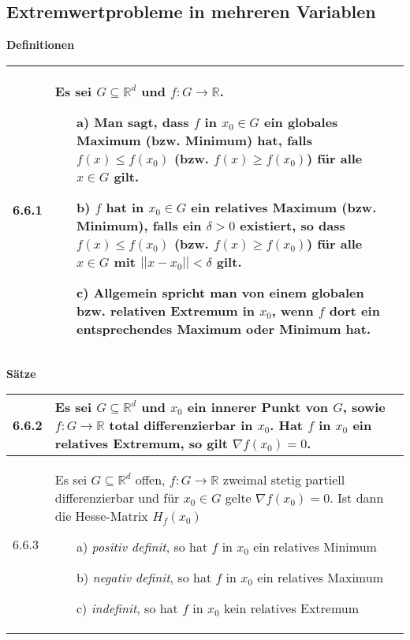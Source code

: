 \subsection{Extremwertprobleme in mehreren Variablen}

    \noindent
    \textbf{Definitionen}
      
    \begin{longtable}{p{1cm} p{16cm}}
        \toprule

        6.6.1 & Es sei $G \subseteq \mathbb{R}^d$ und $f: G \rightarrow \mathbb{R}$.
                \begin{itemize}[topsep=-0.5cm]
                    \item[a)] Man sagt, dass $f$ in $x_0 \in G$ ein globales Maximum (bzw. Minimum) hat, falls  $f(x) \leq f(x_0)$
                                (bzw. $f(x) \geq f(x_0)$) für alle $x \in G$ gilt.
                    \item[b)] $f$ hat in $x_0 \in G$ ein relatives Maximum (bzw. Minimum), falls ein $\delta > 0$ existiert, so dass
                                $f(x) \leq f(x_0)$ (bzw. $f(x) \geq f(x_0)$) für alle $x \in G$ mit $||x-x_0|| < \delta$ gilt.
                    \item[c)] Allgemein spricht man von einem globalen bzw. relativen Extremum in $x_0$, wenn $f$ dort ein entsprechendes
                                Maximum oder Minimum hat.  
                \end{itemize} \vspace{-0cm} \\ 

        \bottomrule

    \end{longtable}
    

    \noindent 
    \textbf{Sätze}
    
    \begin{longtable}{p{1cm} p{16cm}}
        \toprule

        6.6.2 & Es sei $G \subseteq \mathbb{R}^d$ und $x_0$ ein innerer Punkt von $G$, sowie $f: G \rightarrow \mathbb{R}$ total
                differenzierbar in $x_0$. Hat $f$ in $x_0$ ein relatives Extremum, so gilt $\nabla f(x_0) = 0$. \\
        \midrule
        6.6.3 & Es sei $G \subseteq \mathbb{R}^d$ offen, $f: G \rightarrow \mathbb{R}$ zweimal stetig partiell differenzierbar und für
                $x_0 \in G$ gelte $\nabla f(x_0) = 0$. Ist dann die Hesse-Matrix $H_f(x_0)$ 
                \begin{itemize}[topsep=-0.5cm]
                    \item[a)] \textit{positiv definit}, so hat $f$ in $x_0$ ein relatives Minimum
                    \item[b)] \textit{negativ definit}, so hat $f$ in $x_0$ ein relatives Maximum
                    \item[c)] \textit{indefinit}, so hat $f$ in $x_0$ kein relatives Extremum
                \end{itemize} \vspace{-0cm} \\


        \bottomrule
    \end{longtable}
    

